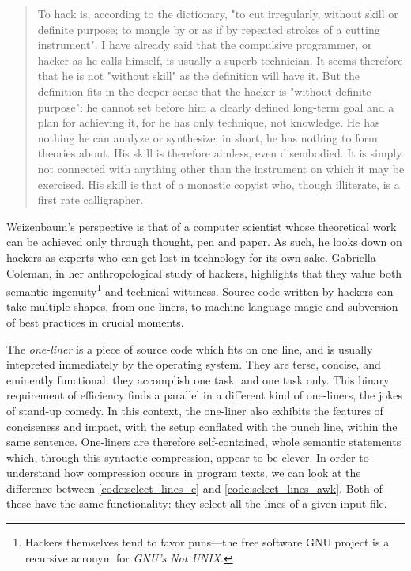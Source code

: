 \begin{quote}
  To hack is, according to the dictionary, "to cut irregularly, without skill or definite purpose; to mangle by or as if by repeated strokes of a cutting instrument". I have already said that the compulsive programmer, or hacker as he calls himself, is usually a superb technician. It seems therefore that he is not "without skill" as the definition will have it. But the definition fits in the deeper sense that the hacker is "without definite purpose": he cannot set before him a clearly defined long-term goal and a plan for achieving it, for he has only technique, not knowledge. He has nothing he can analyze or synthesize; in short, he has nothing to form theories about. His skill is therefore aimless, even disembodied. It is simply not connected with anything other than the instrument on which it may be exercised. His skill is that of a monastic copyist who, though illiterate, is a first rate calligrapher. \citep{weizenbaum_computer_1976}
\end{quote}

Weizenbaum's perspective is that of a computer scientist whose theoretical work can be achieved only through thought, pen and paper. As such, he looks down on hackers as experts who can get lost in technology for its own sake. Gabriella Coleman, in her anthropological study of hackers, highlights that they value both semantic ingenuity\footnote{Hackers themselves tend to favor puns—the free software GNU project is a recursive acronym for \emph{GNU's Not UNIX}.} and technical wittiness\citep{coleman_coding_2012}. Source code written by hackers can take multiple shapes, from one-liners, to machine language magic and subversion of best practices in crucial moments.

The \emph{one-liner} is a piece of source code which fits on one line, and is usually intepreted immediately by the operating system. They are terse, concise, and eminently functional: they accomplish one task, and one task only. This binary requirement of efficiency finds a parallel in a different kind of one-liners, the jokes of stand-up comedy. In this context, the one-liner also exhibits the features of conciseness and impact, with the setup conflated with the punch line, within the same sentence. One-liners are therefore self-contained, whole semantic statements which, through this syntactic compression, appear to be clever. In order to understand how compression occurs in program texts, we can look at the difference between \autoref{code:select_lines_c} and \autoref{code:select_lines_awk}. Both of these have the same functionality: they select all the lines of a given input file.

